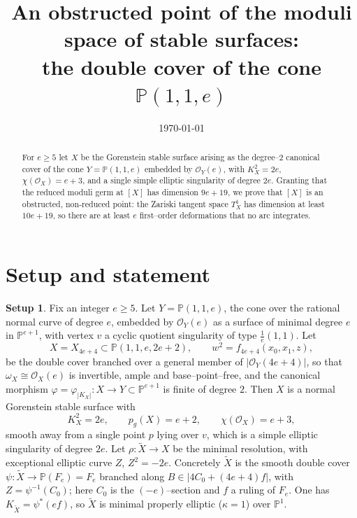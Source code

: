 \documentclass[11pt]{amsart}
\theoremstyle{definition}
\newtheorem{setup}{Setup}
\newcommand{\cO}{\mathcal{O}}
\newcommand{\PP}{\mathbb{P}}
\newcommand{\Xt}{\widetilde{X}}
\begin{document}
\title{An obstructed point of the moduli space of stable surfaces:\\
the double cover of the cone $\PP(1,1,e)$}
\author{}
\date{\today}

\begin{abstract}
For $e\ge 5$ let $X$ be the Gorenstein stable surface arising as the degree--$2$
canonical cover of the cone $Y=\PP(1,1,e)$ embedded by $\cO_Y(e)$, with
$K_X^2=2e$, $\chi(\cO_X)=e+3$, and a single simple elliptic singularity of
degree $2e$. Granting that the reduced moduli germ at $[X]$ has dimension
$9e+19$, we prove that $[X]$ is an obstructed, non-reduced point: the Zariski
tangent space $T^1_X$ has dimension at least $10e+19$, so there are at least
$e$ first--order deformations that no arc integrates.
\end{abstract}

\maketitle

\section{Setup and statement}

\begin{setup}\label{setup}
Fix an integer $e\ge 5$. Let $Y=\PP(1,1,e)$, the cone over the rational normal
curve of degree $e$, embedded by $\cO_Y(e)$ as a surface of minimal degree $e$
in $\PP^{e+1}$, with vertex $v$ a cyclic quotient singularity of type
$\tfrac1e(1,1)$. Let
\[
X=X_{4e+4}\subset \PP(1,1,e,2e+2),\qquad w^2=f_{4e+4}(x_0,x_1,z),
\]
be the double cover branched over a general member of $|\cO_Y(4e+4)|$, so that
$\omega_X\cong\cO_X(e)$ is invertible, ample and base--point--free, and the
canonical morphism $\varphi=\varphi_{|K_X|}\colon X\to Y\subset\PP^{e+1}$ is
finite of degree $2$. Then $X$ is a normal Gorenstein stable surface with
\[
K_X^2=2e,\qquad p_g(X)=e+2,\qquad \chi(\cO_X)=e+3,
\]
smooth away from a single point $p$ lying over $v$, which is a simple elliptic
singularity of degree $2e$. Let $\rho\colon \Xt\to X$ be the minimal
resolution, with exceptional elliptic curve $Z$, $Z^2=-2e$. Concretely $\Xt$ is
the smooth double cover $\psi\colon\Xt\to \PP(F_e)=F_e$ branched along
$B\in|4C_0+(4e+4)f|$, with $Z=\psi^{-1}(C_0)$; here $C_0$ is the $(-e)$--section
and $f$ a ruling of $F_e$. One has $K_{\Xt}=\psi^*(ef)$, so $\Xt$ is minimal
properly elliptic ($\kappa=1$) over $\PP^1$.
\end{setup}
\end{document}
